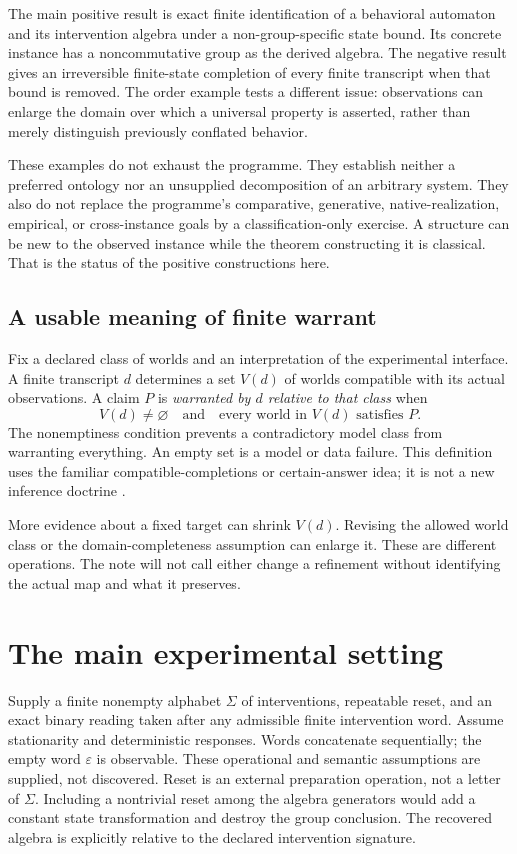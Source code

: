 \documentclass[11pt]{article}
\theoremstyle{remark}
\newcommand{\eps}{\varepsilon}
\begin{document}
The main positive result is exact finite identification of a behavioral automaton and its intervention algebra under a non-group-specific state bound. Its concrete instance has a noncommutative group as the derived algebra. The negative result gives an irreversible finite-state completion of every finite transcript when that bound is removed. The order example tests a different issue: observations can enlarge the domain over which a universal property is asserted, rather than merely distinguish previously conflated behavior.

These examples do not exhaust the programme. They establish neither a preferred ontology nor an unsupplied decomposition of an arbitrary system. They also do not replace the programme's comparative, generative, native-realization, empirical, or cross-instance goals by a classification-only exercise. A structure can be new to the observed instance while the theorem constructing it is classical. That is the status of the positive constructions here.

\subsection{A usable meaning of finite warrant}

Fix a declared class of worlds and an interpretation of the experimental interface. A finite transcript $d$ determines a set $V(d)$ of worlds compatible with its actual observations. A claim $P$ is \emph{warranted by $d$ relative to that class} when
\[
 V(d)\ne\varnothing
 \quad\text{and}\quad
 \text{every world in }V(d)\text{ satisfies }P.
\]
The nonemptiness condition prevents a contradictory model class from warranting everything. An empty set is a model or data failure. This definition uses the familiar compatible-completions or certain-answer idea; it is not a new inference doctrine \cite{Libkin}.

More evidence about a fixed target can shrink $V(d)$. Revising the allowed world class or the domain-completeness assumption can enlarge it. These are different operations. The note will not call either change a refinement without identifying the actual map and what it preserves.

\section{The main experimental setting}
\label{sec:setting}

Supply a finite nonempty alphabet $\Sigma$ of interventions, repeatable reset, and an exact binary reading taken after any admissible finite intervention word. Assume stationarity and deterministic responses. Words concatenate sequentially; the empty word $\eps$ is observable. These operational and semantic assumptions are supplied, not discovered. Reset is an external preparation operation, not a letter of $\Sigma$. Including a nontrivial reset among the algebra generators would add a constant state transformation and destroy the group conclusion. The recovered algebra is explicitly relative to the declared intervention signature.
\end{document}
